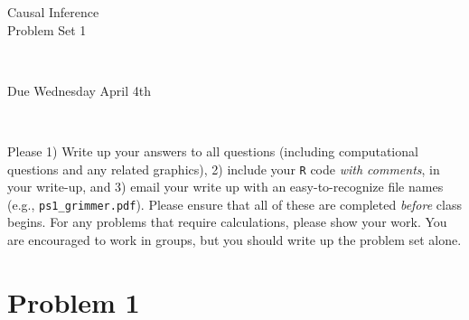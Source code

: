 \documentclass[12pt,letterpaper]{article}
\begin{document}
\begin{center}
\begin{LARGE}Causal Inference \\ Problem Set 1\end{LARGE} \\
\bigskip

\begin{large} Due Wednesday April 4th
\end{large} \\
\end{center}

\noindent Please 1) Write up your answers to all questions (including computational questions and any related graphics), 2) include your {\tt R} code \emph{with comments}, in your write-up, and 3) email your write up with an easy-to-recognize file names (e.g., \texttt{ps1\_grimmer.pdf}).  Please ensure that all of these are completed \emph{before} class begins.  For any problems that require calculations, please show your work. You are encouraged to work in groups, but you should write up the problem set alone.

\section*{Problem 1}
\end{document}

